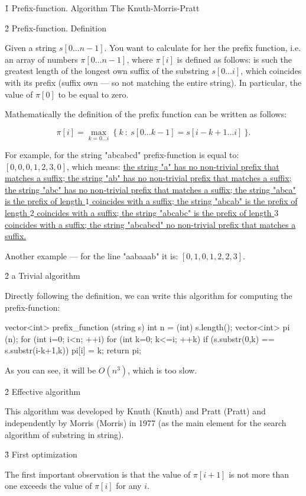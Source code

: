 \h1{ Prefix-function. Algorithm The Knuth-Morris-Pratt }


\h2{ Prefix-function. Definition }

Given a string $s[0 \ldots n-1]$. You want to calculate for her the prefix function, i.e. an array of numbers $\pi[0 \ldots n-1]$, where $\pi[i]$ is defined as follows: is such the greatest length of the longest own suffix of the substring $s[0 \ldots i]$, which coincides with its prefix (suffix own --- so not matching the entire string). In particular, the value of $\pi[0]$ to be equal to zero.

Mathematically the definition of the prefix function can be written as follows:

$$ \pi[i] = \max_{k=0 \ldots i} ~ \{ ~ k ~ : ~ s[0 \ldots k-1] = s[i-k+1 \ldots i] ~ \}. $$

For example, for the string "abcabcd" prefix-function is equal to: $[0, 0, 0, 1, 2, 3, 0]$, which means:
\ul{
\li the string "a" has no non-trivial prefix that matches a suffix;
\li the string "ab" has no non-trivial prefix that matches a suffix;
\li the string "abc" has no non-trivial prefix that matches a suffix;
\li the string "abca" is the prefix of length $1$ coincides with a suffix;
\li the string "abcab" is the prefix of length $2$ coincides with a suffix;
\li the string "abcabc" is the prefix of length $3$ coincides with a suffix;
\li the string "abcabcd" no non-trivial prefix that matches a suffix.
}

Another example --- for the line "aabaaab" it is: $[0, 1, 0, 1, 2, 2, 3]$.


\h2{ a Trivial algorithm }

Directly following the definition, we can write this algorithm for computing the prefix-function:

\code
vector<int> prefix_function (string s) {
int n = (int) s.length();
vector<int> pi (n);
for (int i=0; i<n; ++i)
for (int k=0; k<=i; ++k)
if (s.substr(0,k) == s.substr(i-k+1,k))
pi[i] = k;
return pi;
}
\endcode

As you can see, it will be $O(n^3)$, which is too slow.


\h2{ Effective algorithm }

This algorithm was developed by Knuth (Knuth) and Pratt (Pratt) and independently by Morris (Morris) in 1977 (as the main element for the search algorithm of substring in string).

\h3{ First optimization }

The first important observation is that the value of $\pi[i+1]$ is not more than one exceeds the value of $\pi[i]$ for any $i$.

